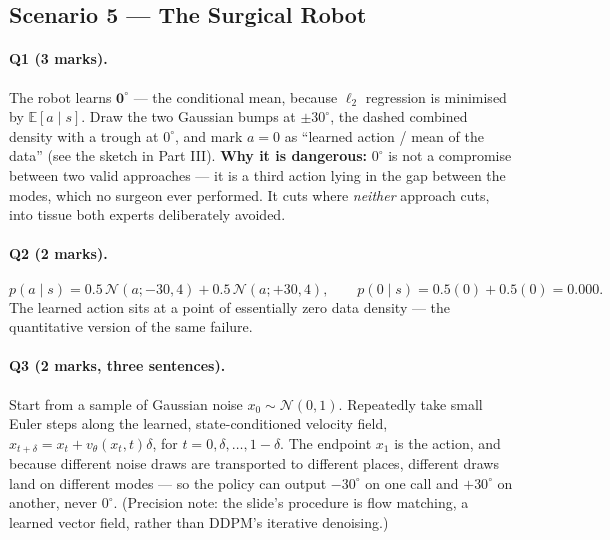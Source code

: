 \documentclass[11pt,a4paper]{article}
\begin{document}
\subsection{Scenario 5 --- The Surgical Robot}

\paragraph{Q1 (3 marks).} The robot learns $\mathbf{0^\circ}$ --- the
conditional mean, because $\ell_2$ regression is minimised by
$\mathbb E[a\mid s]$. Draw the two Gaussian bumps at $\pm30^\circ$, the dashed
combined density with a trough at $0^\circ$, and mark $a=0$ as ``learned
action / mean of the data'' (see the sketch in Part III). \textbf{Why it is
dangerous:} $0^\circ$ is not a compromise between two valid approaches --- it
is a third action lying in the gap between the modes, which no surgeon ever
performed. It cuts where \emph{neither} approach cuts, into tissue both
experts deliberately avoided.

\paragraph{Q2 (2 marks).}
\[
p(a\mid s)=0.5\,\mathcal N(a;-30,4)+0.5\,\mathcal N(a;+30,4),
\qquad
p(0\mid s)=0.5(0)+0.5(0)=\mathbf{0.000}.
\]
The learned action sits at a point of essentially zero data density --- the
quantitative version of the same failure.

\paragraph{Q3 (2 marks, three sentences).} Start from a sample of Gaussian
noise $x_0\sim\mathcal N(0,1)$. Repeatedly take small Euler steps along the
learned, state-conditioned velocity field,
$x_{t+\delta}=x_t+v_\theta(x_t,t)\delta$, for $t=0,\delta,\dots,1-\delta$.
The endpoint $x_1$ is the action, and because different noise draws are
transported to different places, different draws land on different modes ---
so the policy can output $-30^\circ$ on one call and $+30^\circ$ on another,
never $0^\circ$. (Precision note: the slide's procedure is flow matching, a
learned vector field, rather than DDPM's iterative denoising.)
\end{document}
